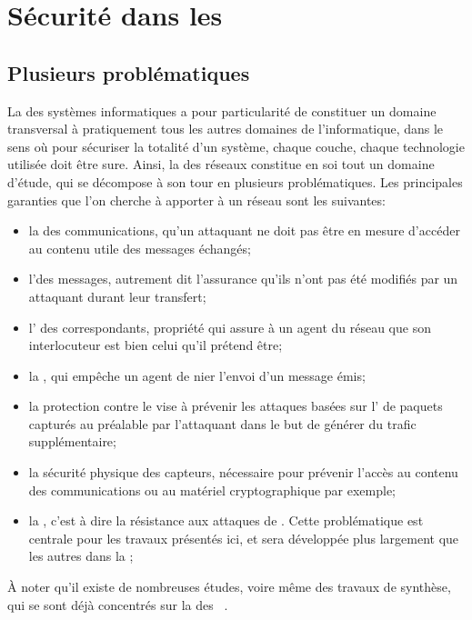 \section{Sécurité dans les \rcs}\label{ea:sec:secu}

\subsection{Plusieurs problématiques}

La \secu des systèmes informatiques a pour particularité de constituer un domaine transversal à pratiquement tous les autres domaines de l'informatique, dans le sens où pour sécuriser la totalité d'un système, chaque couche, chaque technologie utilisée doit être sure.
Ainsi, la \secu des réseaux constitue en soi tout un domaine d'étude, qui se décompose à son tour en plusieurs problématiques.
Les principales garanties que l'on cherche à apporter à un réseau sont les suivantes:
\begin{itemize}
    \item la  des communications, \cad qu'un attaquant ne doit pas être en mesure d'accéder au contenu utile des messages échangés;
    \item l'\integrite des messages, autrement dit l'assurance qu'ils n'ont pas été modifiés par un attaquant durant leur transfert;
    \item l' des correspondants, propriété qui assure à un agent du réseau que son interlocuteur est bien celui qu'il prétend être;
    \item la , qui empêche un agent de nier l'envoi d'un message émis;
    \item la protection contre le  vise à prévenir les attaques basées sur l' de paquets capturés au préalable par l'attaquant dans le but de générer du trafic supplémentaire;
    \item la sécurité physique des capteurs, nécessaire pour prévenir l'accès au contenu des communications ou au matériel cryptographique par exemple;
    \item la \label{ea:def:dispo}, c'est à dire la résistance aux attaques de \dds. Cette problématique est centrale pour les travaux présentés ici, et sera développée plus largement que les autres dans la ;
\end{itemize}
À noter qu'il existe de nombreuses études, voire même des travaux de synthèse, qui se sont déjà concentrés sur la \secu des \rcs~\cite{DYK12,AD14}.

